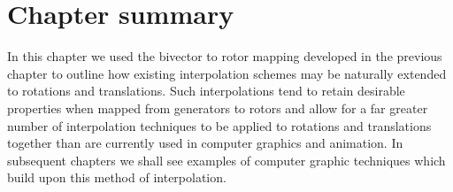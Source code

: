 %
%
%
%
%

\section{Chapter summary}

In this chapter we used the bivector to rotor mapping developed in the
previous chapter to outline how existing interpolation schemes
may be naturally extended to rotations and translations. 
Such interpolations tend to retain desirable properties when mapped
from generators to rotors and allow for a far greater number of interpolation
techniques to be applied to rotations and translations together than
are currently used in computer graphics and animation. In subsequent chapters
we shall see examples of computer graphic techniques which build upon
this method of interpolation.
